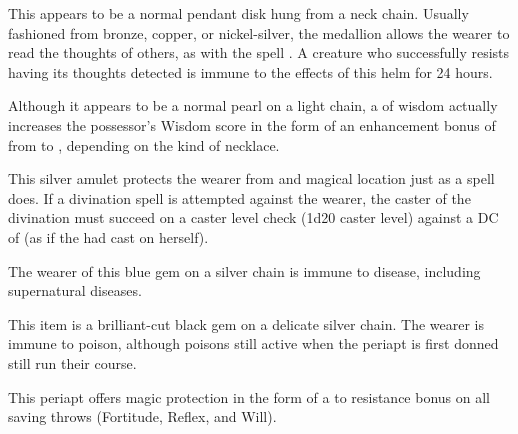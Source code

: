  This appears to be a normal pendant disk hung from a neck chain. Usually fashioned from bronze, copper, or nickel-silver, the medallion allows the wearer to read the thoughts of others, as with the spell . A creature who successfully resists having its thoughts detected is immune to the effects of this helm for 24 hours.

 Although it appears to be a normal pearl on a light chain, a  of wisdom actually increases the possessor's Wisdom score in the form of an enhancement bonus of from  to , depending on the kind of necklace.

 This silver amulet protects the wearer from  and magical location just as a  spell does. If a divination spell is attempted against the wearer, the caster of the divination must succeed on a caster level check (1d20 \add caster level) against a DC of  (as if the  had cast  on herself).

 The wearer of this blue gem on a silver chain is immune to disease, including supernatural diseases.

 This item is a brilliant-cut black gem on a delicate silver chain. The wearer is immune to poison, although poisons still active when the periapt is first donned still run their course.

 This periapt offers magic protection in the form of a  to  resistance bonus on all saving throws (Fortitude, Reflex, and Will).

